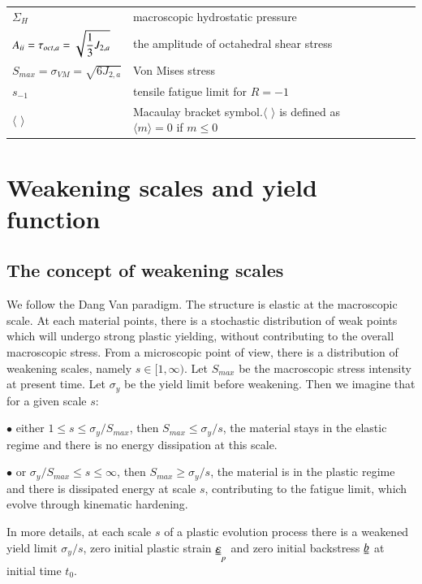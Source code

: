\documentclass[3p,times,number,review]{elsarticle}
\begin{document}
\begin{flushleft}
\begin{table}[h]
\begin{tabular}{lllll}
			$\Sigma_H$& macroscopic hydrostatic pressure &  &  &  \\
			$A_{\uppercase\expandafter{\romannumeral2}}=\tau_{oct,a}=\sqrt{\dfrac{1}{3}J_{2,a}}$& the amplitude of octahedral shear stress &  &  &  \\
			$S_{max}=\sigma_{VM}=\sqrt{6J_{2,a}}$& Von Mises stress &  &  &  \\
			$s_{-1}$& tensile fatigue limit for $R=-1$  &  &  &  \\
			$\langle$ $\rangle$& Macaulay bracket symbol.$\langle$ $\rangle$ is defined as $\langle m\rangle=0$ if $m\leqslant0$
	\end{tabular}
	\end{table}
\end{flushleft}

\clearpage

\section{Weakening scales and yield function}
\subsection{The concept of weakening scales} 

We follow the Dang Van paradigm. The structure is elastic at the macroscopic scale. At each material points, there is a stochastic distribution of weak points which will undergo strong plastic yielding, without contributing to the overall macroscopic stress. From a microscopic point of view, there is a distribution of weakening scales, namely $s\in[1,\infty)$. Let $S_{max}$ be the macroscopic stress intensity at present time. Let $\sigma_y$ be the yield limit before weakening. Then we imagine that for a given scale $s$:

\vspace{6pt}
\noindent
$\bullet$ either $1\leqslant s\leqslant \sigma_y/S_{max}$, then $S_{max}\leqslant \sigma_y/s$, the material stays in the elastic regime and there is no energy dissipation at this scale.

\vspace{6pt}
\noindent
$\bullet$ or $\sigma_y/S_{max}\leqslant s\leqslant \infty$, then $S_{max}\geqslant \sigma_y/s$, the material is in the plastic regime and there is dissipated energy at scale $s$, contributing to the fatigue limit, which evolve through kinematic hardening.

In more details, at each scale $s$ of a plastic evolution process there is a weakened yield limit $\sigma_y/s$, zero initial plastic strain $\uuline{\varepsilon}_p$ and zero initial backstress $\uuline{b}$ at initial time $t_0$.
\end{document}
